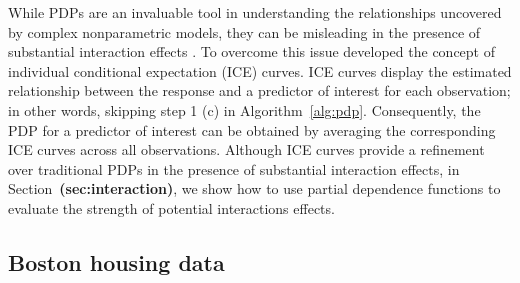 \documentclass[12pt]{article}
\def\ref#1{\textbf{(#1)}}
\begin{document}
While PDPs are an invaluable tool in understanding the relationships uncovered by complex nonparametric models, they can be misleading in the presence of substantial interaction effects \citep{goldstein-peeking-2015}. To overcome this issue \citeauthor{goldstein-peeking-2015} developed the concept of individual conditional expectation (ICE) curves. ICE curves display the estimated relationship between the response and a predictor of interest for each observation; in other words, skipping step 1 (c) in Algorithm~\eqref{alg:pdp}. Consequently, the PDP for a predictor of interest can be obtained by averaging the corresponding ICE curves across all observations. Although ICE curves provide a refinement over traditional PDPs in the presence of substantial interaction effects, in Section~\ref{sec:interaction}, we show how to use partial dependence functions to evaluate the strength of potential interactions effects.


\subsection{Boston housing data}
\end{document}
